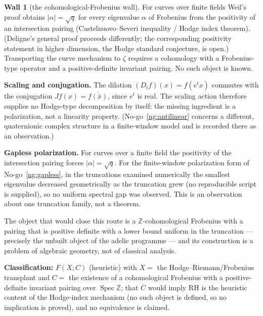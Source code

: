 \documentclass[11pt]{amsart}
\theoremstyle{definition}
\theoremstyle{remark}
\theoremstyle{definition}
\newtheorem{obstruction}{Wall}[section]
\newcommand{\Spec}{\operatorname{Spec}}
\newcommand{\Z}{\mathbb{Z}}
\begin{document}
\begin{obstruction}[the cohomological-Frobenius wall]\label{ob:cohom}
For curves over finite fields Weil's proof \cite{Weil1948} obtains $|\alpha|=\sqrt q$ for every
eigenvalue $\alpha$ of Frobenius from the positivity of an intersection pairing (Castelnuovo--Severi
inequality / Hodge index theorem). (Deligne's general proof \cite{Deligne} proceeds differently; the
corresponding positivity statement in higher dimension, the Hodge standard conjecture, is open.)
Transporting the curve mechanism to $\zeta$ requires a cohomology with a Frobenius-type operator and a
positive-definite invariant pairing. No such object is known.

\textbf{Scaling and conjugation.} The dilation $(D_tf)(x)=f(e^tx)$ commutes with the conjugation
$Jf(x)=\overline{f(\bar x)}$, since $e^t$ is real. The scaling action therefore supplies no Hodge-type
decomposition by itself: the missing ingredient is a polarization, not a linearity property.
(No-go~\ref{ng:antilinear} concerns a different, quaternionic complex structure in a finite-window model
and is recorded there as an observation.)

\textbf{Gapless polarization.} For curves over a finite field the positivity of the intersection pairing
forces $|\alpha|=\sqrt q$. For the finite-window polarization form of
No-go~\ref{ng:gapless}, in the truncations examined numerically the smallest eigenvalue decreased
geometrically as the truncation grew (no reproducible script is supplied), so no uniform spectral gap was
observed. This is an observation about one truncation family, not a theorem.

The object that would close this route is a $\mathbb Z$-cohomological Frobenius with a pairing that is
positive definite with a lower bound uniform in the truncation --- precisely the unbuilt object of the adelic programme \cite{connesconsani-site} --- and its
construction is a problem of algebraic geometry, not of classical analysis.

\smallskip\noindent\textbf{Classification:} $F(X;C)$ (heuristic) with $X=$ the Hodge--Riemann/Frobenius
transplant and $C=$ the existence of a cohomological Frobenius with a positive-definite invariant pairing over
$\Spec\Z$; that $C$ would imply RH is the heuristic content of the Hodge-index mechanism (no such object
is defined, so no implication is proved), and no equivalence is claimed.
\end{obstruction}
\end{document}
